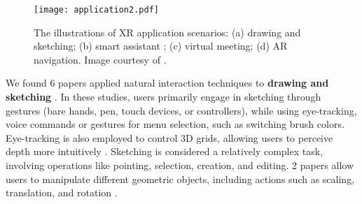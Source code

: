 \documentclass[review]{fcs}
\newcommand{\revise}[2]{\textcolor[rgb]{0,0,0}{#2}}
\begin{document}

\begin{figure}
    \begin{center}
    \texttt{[image: application2.pdf]}
    \end{center}
    \caption{
\revise{}{The illustrations of XR application scenarios: (a) drawing and sketching; (b) smart assistant \cite{DBLP:conf/chi/0005WBCRF24}; (c) virtual meeting; (d) AR navigation. Image courtesy of \cite{DBLP:conf/chi/0005WBCRF24}.}
    }
    \label{fig:application}
\end{figure}

We found 6 papers applied natural interaction techniques to \textbf{drawing and sketching} \cite{DBLP:conf/ismar/ChenGFCL23, DBLP:conf/chi/TurkmenGBSASPM24, DBLP:journals/tvcg/XuZSFY23, 10.1145/3613904.3642758, DBLP:journals/imwut/ChenLYZ22, DBLP:journals/tvcg/SongDK23}. In these studies, users primarily engage in sketching through gestures (bare hands, pen, touch devices, or controllers), while using eye-tracking, voice commands or gestures for menu selection, such as switching brush colors. Eye-tracking is also employed to control 3D grids, allowing users to perceive depth more intuitively \cite{DBLP:conf/chi/TurkmenGBSASPM24}. Sketching is considered a relatively complex task, involving operations like pointing, selection, creation, and editing. 2 papers allow users to manipulate different geometric objects, including actions such as scaling, translation, and rotation \cite{DBLP:journals/tvcg/SongDK23, DBLP:journals/tvcg/XuZSFY23}.
\end{document}
